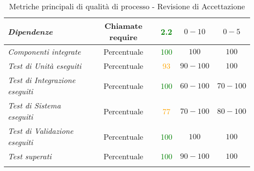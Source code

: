 \begin{longtable}{|>{\centering}m{5cm}|c|c|c|c|}
\emph{Dipendenze} & {Chiamate require} & \textcolor{Green}{2.2} & $0 - 10$ & $0 - 5$\\ \hline
\emph{Componenti integrate} & {Percentuale} & \textcolor{Green}{100} & $100$ & $100$\\ \hline
\emph{Test di Unità eseguiti} & {Percentuale} & \textcolor{Orange}{93} & $90 - 100$ & $100$\\ \hline
\emph{Test di Integrazione eseguiti} & {Percentuale} & \textcolor{Green}{100} & $60 - 100$ & $70 - 100$\\ \hline
\emph{Test di Sistema eseguiti} & {Percentuale} & \textcolor{Orange}{77} & $70 - 100$ & $80 - 100$\\ \hline
\emph{Test di Validazione eseguiti} & {Percentuale} & \textcolor{Green}{100} & $100$ & $100$\\ \hline
\emph{Test superati} & {Percentuale} & \textcolor{Green}{100} & $90 - 100$ & $100$\\ \hline
\caption{Metriche principali di qualità di processo - Revisione di Accettazione}
\end{longtable}

